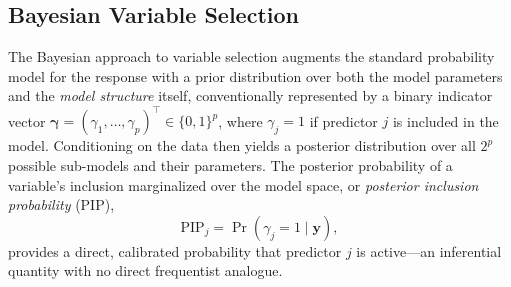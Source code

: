 

\subsection{Bayesian Variable Selection}
\label{subsec:bvs}

The Bayesian approach to variable selection augments the standard
probability model for the response with a prior distribution over
both the model parameters and the \emph{model structure} itself,
conventionally represented by a binary indicator vector
$\boldsymbol{\gamma} = (\gamma_1, \ldots, \gamma_p)^\top \in \{0,1\}^p$,
where $\gamma_j = 1$ if predictor $j$ is included in the model.
Conditioning on the data then yields a posterior distribution over
all $2^p$ possible sub-models and their parameters.  The posterior probability of a variable's inclusion marginalized over the model space, or 
\emph{posterior inclusion probability} (PIP),
\begin{equation}
  \mathrm{PIP}_j = \Pr(\gamma_j = 1 \mid \mathbf{y}),
  \label{eq:pip}
\end{equation}
provides a direct, calibrated probability that predictor $j$ is
active---an inferential quantity with no direct frequentist analogue.

